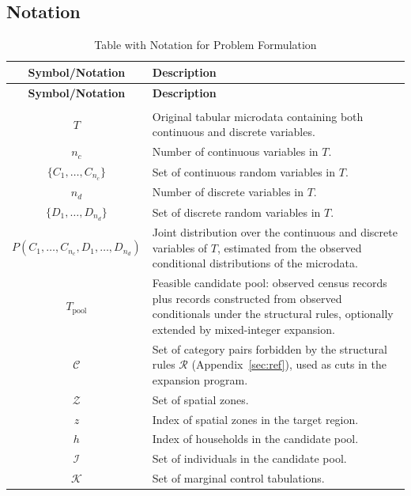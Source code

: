 \subsection{Notation}
\begin{longtable}{|c|p{10cm}|}
\hline
\textbf{Symbol/Notation} & \textbf{Description} \\ \hline
\endfirsthead

\hline
\textbf{Symbol/Notation} & \textbf{Description} \\ \hline
\endhead

\hline
\endfoot

\hline
\caption{Table with Notation for Problem Formulation} \\
\endlastfoot

\( T \) & Original tabular microdata containing both continuous and discrete variables. \\ \hline
\( n_c \) & Number of continuous variables in \( T \). \\ \hline
\( \{C_1, \dots, C_{n_c}\} \) & Set of continuous random variables in \( T \). \\ \hline
\( n_d \) & Number of discrete variables in \( T \). \\ \hline
\( \{D_1, \dots, D_{n_d}\} \) & Set of discrete random variables in \( T \). \\ \hline
\( P(C_1, \dots, C_{n_c}, D_1, \dots, D_{n_d}) \) & Joint distribution over the continuous and discrete variables of \( T \), estimated from the observed conditional distributions of the microdata. \\ \hline
\( T_{\text{pool}} \) & Feasible candidate pool: observed census records plus records constructed from observed conditionals under the structural rules, optionally extended by mixed-integer expansion. \\ \hline
\( \mathcal{C} \) & Set of category pairs forbidden by the structural rules $\mathcal{R}$ (Appendix~\ref{sec:ref}), used as cuts in the expansion program. \\ \hline
\( \mathcal{Z} \) & Set of spatial zones. \\ \hline
\( z \) & Index of spatial zones in the target region. \\ \hline
\( h \) & Index of households in the candidate pool. \\ \hline
\( \mathcal{I} \) & Set of individuals in the candidate pool. \\ \hline
\( \mathcal{K} \) & Set of marginal control tabulations. \\ \hline

\end{longtable}
